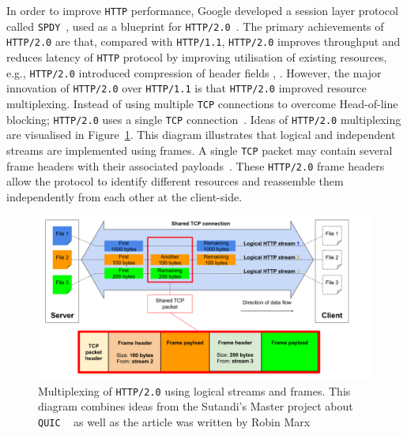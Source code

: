 \documentclass[12pt,a4paper]{report}
\begin{document}
In order to improve \texttt{HTTP} performance, Google developed a session layer protocol called \texttt{SPDY}~\cite{bib_SPDY_white_paper}, used as a blueprint for \texttt{HTTP/2.0}~\cite{bib_SPDY_vs_HTTP2}.
The primary achievements of \texttt{HTTP/2.0} are that, compared with \texttt{HTTP/1.1}, \texttt{HTTP/2.0} improves throughput and reduces latency of \texttt{HTTP} protocol by improving utilisation of existing resources, e.g., \texttt{HTTP/2.0} introduced compression of header fields \cite[Chapter~12]{bib_grigorik2013}, .
However, the major innovation of \texttt{HTTP/2.0} over \texttt{HTTP/1.1} is that \texttt{HTTP/2.0} improved resource multiplexing.
Instead of using multiple \texttt{TCP} connections to overcome Head-of-line blocking; \texttt{HTTP/2.0} uses a single \texttt{TCP} connection~\cite{bib_grigorik2013, head-of-line-blocking-in-quic-and-http-3-the-details}.
Ideas of \texttt{HTTP/2.0} multiplexing are visualised in Figure~\ref{fig:Multiplexing_HTTP2}.
This diagram illustrates that logical and independent streams are implemented using frames.
A single \texttt{TCP} packet may contain several frame headers with their associated payloads~\cite{head-of-line-blocking-in-quic-and-http-3-the-details}.
These \texttt{HTTP/2.0} frame headers allow the protocol to identify different resources and reassemble them independently from each other at the client-side.

    \begin{figure}[htbp]
    \centering
    \includegraphics[width=\textwidth]{figs/Multiplexing_HTTP2.png}
    \caption[Multiplexing of \texttt{HTTP/2.0} using logical streams and frames]{Multiplexing of \texttt{HTTP/2.0} using logical streams and frames. This diagram combines ideas from the Sutandi's Master project about \texttt{QUIC}
   ~\cite{overview_of_the_QUIC_protocol}
    as well as the article was written by Robin Marx~\cite{head-of-line-blocking-in-quic-and-http-3-the-details}}
    \label{fig:Multiplexing_HTTP2}
    \end{figure}
    
\end{document}
